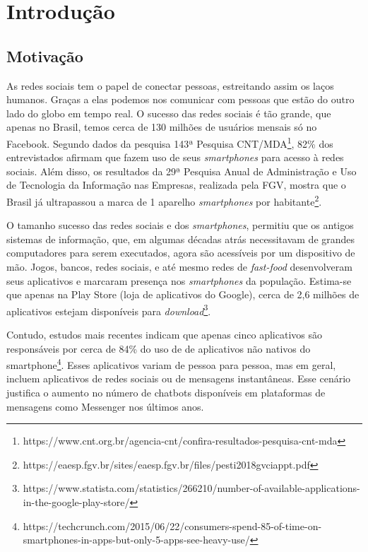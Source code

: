   \chapter{Introdução}
  
  \section{Motivação}
  As redes sociais tem o papel de conectar pessoas, estreitando assim os laços humanos. Graças a elas podemos nos comunicar com pessoas que estão do outro lado do globo em tempo real. O sucesso das redes sociais é tão grande, que apenas no Brasil, temos cerca de 130 milhões de usuários mensais só no Facebook. Segundo dados da pesquisa 143ª Pesquisa CNT/MDA\footnote{https://www.cnt.org.br/agencia-cnt/confira-resultados-pesquisa-cnt-mda}, 82\% dos entrevistados afirmam que fazem uso de seus \emph{smartphones} para acesso à redes sociais. Além disso, os resultados da 29ª Pesquisa Anual de Administração e Uso de Tecnologia da Informação nas Empresas, realizada pela FGV, mostra que o Brasil já ultrapassou a marca de 1 aparelho \emph{smartphones} por habitante\footnote{https://eaesp.fgv.br/sites/eaesp.fgv.br/files/pesti2018gvciappt.pdf}.
  
  O tamanho sucesso das redes sociais e dos \emph{smartphones}, permitiu que os antigos sistemas de informação, que, em algumas décadas atrás necessitavam de grandes computadores para serem executados, agora são acessíveis por um dispositivo de mão. Jogos, bancos, redes sociais, e até mesmo redes de \emph{fast-food} desenvolveram seus aplicativos e marcaram presença nos \emph{smartphones} da população. Estima-se que apenas na Play Store (loja de aplicativos do Google), cerca de 2,6 milhões de aplicativos estejam disponíveis para \emph{download}\footnote{https://www.statista.com/statistics/266210/number-of-available-applications-in-the-google-play-store/}.
  
  Contudo, estudos mais recentes indicam que apenas cinco aplicativos são responsáveis por cerca de 84\% do uso de de aplicativos não nativos do smartphone\footnote{https://techcrunch.com/2015/06/22/consumers-spend-85-of-time-on-smartphones-in-apps-but-only-5-apps-see-heavy-use/}. Esses aplicativos variam de pessoa para pessoa, mas em geral, incluem aplicativos de redes sociais ou de mensagens instantâneas. Esse cenário justifica o aumento no número de chatbots disponíveis em plataformas de mensagens como Messenger nos últimos anos.
  
